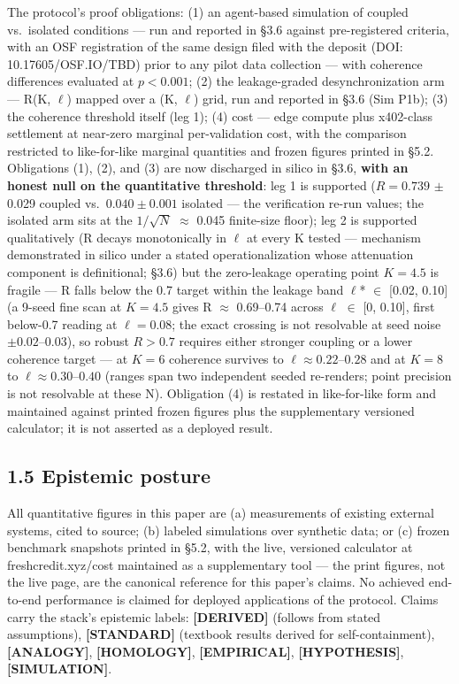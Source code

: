\documentclass[11pt,twocolumn]{article}
\begin{document}
The protocol's proof obligations: (1) an agent-based simulation of
coupled vs.~isolated conditions --- run and reported in §3.6 against
pre-registered criteria, with an OSF registration of the same design filed with the deposit (DOI: 10.17605/OSF.IO/TBD) prior to any pilot data collection --- with coherence differences evaluated at \(p < 0.001\);
(2) the leakage-graded desynchronization arm --- R(K, \(\ell\)) mapped over a
(K, \(\ell\)) grid, run and reported in §3.6 (Sim P1b); (3) the
coherence threshold itself (leg 1); (4) cost --- edge compute plus
x402-class settlement at near-zero marginal per-validation cost, with
the comparison restricted to like-for-like marginal quantities and
frozen figures printed in §5.2. Obligations (1), (2), and (3) are now
discharged in silico in §3.6, \textbf{with an honest null on the
quantitative threshold}: leg 1 is supported (\(R = 0.739\) \(\pm\) 0.029
coupled vs.~\(0.040 \pm 0.001\) isolated --- the verification re-run
values; the isolated arm sits at the \(1/\sqrt{N}\) \(\approx\) 0.045
finite-size floor); leg 2 is supported qualitatively (R decays
monotonically in \(\ell\) at every K tested --- mechanism demonstrated
in silico under a stated operationalization whose attenuation component
is definitional; \S3.6) but the zero-leakage
operating point \(K = 4.5\) is fragile --- R falls below the 0.7 target
within the leakage band \(\ell\)* \(\in\) {[}0.02, 0.10{]} (a 9-seed
fine scan at \(K = 4.5\) gives R \(\approx\) 0.69--0.74 across \(\ell\)
\(\in\) {[}0, 0.10{]}, first below-0.7 reading at \(\ell = 0.08\); the
exact crossing is not resolvable at seed noise \(\pm 0.02–0.03\)), so
robust \(R > 0.7\) requires either stronger coupling or a lower
coherence target --- at \(K = 6\) coherence survives to \(\ell \approx
0.22\text{--}0.28\) and at \(K = 8\) to \(\ell \approx
0.30\text{--}0.40\) (ranges span two independent seeded re-renders;
point precision is not resolvable at these N). Obligation (4) is
restated in like-for-like form and maintained against printed frozen
figures plus the supplementary versioned calculator; it is not asserted
as a deployed result.

\subsection*{1.5 Epistemic posture}

All quantitative figures in this paper are (a) measurements of existing
external systems, cited to source; (b) labeled simulations over
synthetic data; or (c) frozen benchmark snapshots printed in §5.2, with
the live, versioned calculator at freshcredit.xyz/cost maintained as a
supplementary tool --- the print figures, not the live page, are the
canonical reference for this paper's claims. No achieved end-to-end
performance is claimed for deployed applications of the protocol. Claims
carry the stack's epistemic labels: \textbf{{[}DERIVED{]}} (follows from
stated assumptions), \textbf{{[}STANDARD{]}} (textbook results derived
for self-containment), \textbf{{[}ANALOGY{]}}, \textbf{{[}HOMOLOGY{]}},
\textbf{{[}EMPIRICAL{]}}, \textbf{{[}HYPOTHESIS{]}},
\textbf{{[}SIMULATION{]}}.
\end{document}
